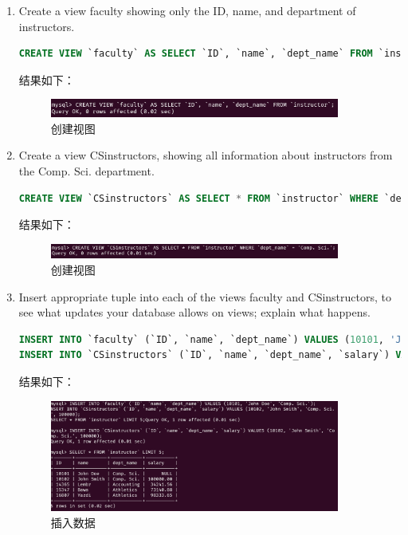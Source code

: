 \documentclass{article}
\begin{document}
\begin{enumerate}
\item Create a view faculty showing only the ID, name, and department of instructors.

\begin{lstlisting}[language=sql]
CREATE VIEW `faculty` AS SELECT `ID`, `name`, `dept_name` FROM `instructor`;
\end{lstlisting}

结果如下：

\begin{figure}[H]
\centering
\includegraphics[width=0.9\textwidth]{img/35.png}
\caption{创建视图}
\end{figure}

\item Create a view CSinstructors, showing all information about instructors from the Comp. Sci. department.

\begin{lstlisting}[language=sql]
CREATE VIEW `CSinstructors` AS SELECT * FROM `instructor` WHERE `dept_name` = 'Comp. Sci.';
\end{lstlisting}

结果如下：

\begin{figure}[H]
\centering
\includegraphics[width=0.9\textwidth]{img/36.png}
\caption{创建视图}
\end{figure}

\item Insert appropriate tuple into each of the views faculty and CSinstructors, to see what updates your database allows on views; explain what happens.

\begin{lstlisting}[language=sql]
INSERT INTO `faculty` (`ID`, `name`, `dept_name`) VALUES (10101, 'John Doe', 'Comp. Sci.');
INSERT INTO `CSinstructors` (`ID`, `name`, `dept_name`, `salary`) VALUES (10102, 'John Smith', 'Comp. Sci.', 100000);
\end{lstlisting}

结果如下：

\begin{figure}[H]
\centering
\includegraphics[width=0.9\textwidth]{img/37.png}
\caption{插入数据}
\end{figure}


\end{enumerate}
\end{document}
